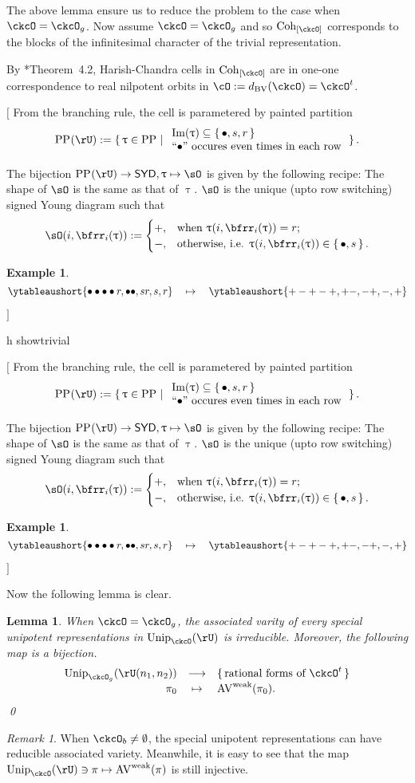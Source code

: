 \documentclass[12pt,a4paper]{amsart}
\let\ytb=\ytableaushort
\newcommand{\trivial}[2][]{\if\relax\detokenize{#1}\relax
  {%
      \color{orange} \vspace{0em} $[$  #2 $]$
      \color{black}
  }
  \else
\ifx#1h
\ifcsname showtrivial\endcsname
{%
    \color{orange} \vspace{0em}  $[$ #2 $]$
    \color{black}
}
\fi
\else {\red Wrong argument!} \fi
\fi
}
\def\Im{\operatorname{Im}}
\numberwithin{equation}{section}
\newtheorem{lem}[thm]{Lemma}
\newtheorem{eg}[thm]{Example}
\theoremstyle{remark}
\newtheorem*{remark}{Remark}
\def\Unip{\mathrm{Unip}}
\begin{document}
The above lemma ensure us to reduce the problem to the case when $\ckcO = \ckcO_g$. 
Now assume $\ckcO = \ckcO_g$ and so $\Cint{\ckcO}$ corresponds to the blocks of 
the infinitesimal character of the trivial representation.   

By \cite{BV.W}*{Theorem~4.2},  Harish-Chandra cells in $\Cint{\ckcO}$ are in one-one
correspondence to real nilpotent orbits in $\cO:=\dBV(\ckcO)=\ckcO^t$. 

\trivial{
From the branching rule, the cell is parametered by painted partition 
\[
\PP{}(\rU):=\set{\uptau\in \PP{}| \begin{array}{l}\Im (\uptau) \subseteq  \set{\bullet, s,r}\\
  \text{``$\bullet$'' occures even times in each row}
\end{array} 
  }.  
\]

The bijection $\PP{}(\rU)\rightarrow \SYD, \uptau\mapsto \sO$ is given by the following recipe:
The shape of $\sO$ is the same as that of $\uptau$. 
$\sO$ is the unique (upto row switching) signed Young diagram such that
\[
  \sO(i,\bfrr_i(\uptau)) := \begin{cases}
    +,  & \text{when }\uptau(i,\bfrr_i(\uptau))=r;\\
    -,  & \text{otherwise, i.e. }\uptau(i,\bfrr_i(\uptau))\in \set{\bullet,s}.
  \end{cases}
\] 

\begin{eg}
  \[
 \ytb{\bullet\bullet\bullet\bullet r,\bullet\bullet , sr,s,r}   
 \quad
 \mapsto\quad
 \ytb{+-+-+,+-, -+,-,+}   
  \]
\end{eg}
}

Now the following lemma is clear. 
\begin{lem}
When $\ckcO=\ckcO_g$, the associated varity of every special unipotent representations in $\Unip_\ckcO(\rU)$  
is irreducible. Moreover, the following map  is a bijection. 
\[  
  \begin{array}{rcl}
  \Unip_{\ckcO_g}(\rU(n_1,n_2)) &\longrightarrow& \set{\text{rational forms of $\ckcO^t$}}\\
  \pi_0 & \mapsto & \wAV(\pi_0).
  \end{array}
\]
\qed
\end{lem}
\begin{remark}
  When $\ckcO_b\neq \emptyset$, the special unipotent representations can have
  reducible associated variety. Meanwhile, it is easy to see that the map
  $\Unip_{\ckcO}(\rU) \ni \pi \mapsto\wAV(\pi)$ is still injective. 
\end{remark}
\end{document}
